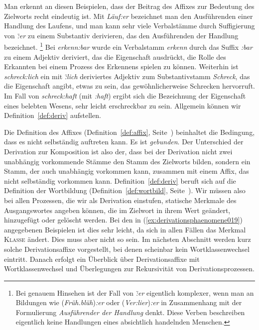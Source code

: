 Man erkennt an diesen Beispielen, dass der Beitrag des Affixes zur Bedeutung des Zielworts recht eindeutig ist.
Mit \textit{Läuf:er} bezeichnet man den Ausführenden einer Handlung des Laufens, und man kann sehr viele Verbalstämme durch Suffigierung von \textit{\~:er} zu einem Substantiv derivieren, das den Ausführenden der Handlung bezeichnet.%
\footnote{Bei genauem Hinsehen ist der Fall von \textit{\~:er} eigentlich komplexer, wenn man an Bildungen wie (\textit{Früh.blüh})\textit{:er} oder (\textit{Ver:lier})\textit{:er} in Zusammenhang mit der Formulierung \textit{Ausführender der Handlung} denkt.
Diese Verben beschreiben eigentlich keine Handlungen eines absichtlich handelnden Menschen.}
Bei \textit{erkenn:bar} wurde ein Verbalstamm \textit{erkenn} durch das Suffix \textit{:bar} zu einem Adjektiv deriviert, das die Eigenschaft ausdrückt, die Rolle des Erkannten bei einem Prozess des Erkennens spielen zu können.
Weiterhin ist \textit{schreck:lich} ein mit \textit{\~:lich} deriviertes Adjektiv zum Substantivstamm \textit{Schreck}, das die Eigenschaft angibt, etwas zu sein, das gewöhnlicherweise Schrecken hervorruft.
Im Fall von \textit{schreck:haft} (mit \textit{:haft}) ergibt sich die Bezeichnung der Eigenschaft eines belebten Wesens, sehr leicht erschreckbar zu sein.
Allgemein können wir Definition~\ref{def:deriv} aufstellen.


Die Definition des Affixes (Definition~\ref{def:affix}, Seite~\pageref{def:affix}) beinhaltet die Bedingung, dass es nicht selbständig auftreten kann.
Es ist \textit{gebunden}.
Der Unterschied der Derivation zur Komposition ist also der, dass bei der Derivation nicht zwei unabhängig vorkommende Stämme den Stamm des Zielworts bilden, sondern ein Stamm, der auch unabhängig vorkommen kann, zusammen mit einem Affix, das nicht selbständig vorkommen kann.
Definition~\ref{def:deriv} beruft sich auf die Definition der Wortbildung (Definition~\ref{def:wortbild}, Seite~\pageref{def:wortbild}).
Wir müssen also bei allen Prozessen, die wir als Derivation einstufen, statische Merkmale des Ausgangswortes angeben können, die im Zielwort in ihrem Wert geändert, hinzugefügt oder gelöscht werden.
Bei den in (\ref{ex:derivationsphaenomene019}) angegebenen Beispielen ist dies sehr leicht, da sich in allen Fällen das Merkmal \textsc{Klasse} ändert.
Dies muss aber nicht so sein.
Im nächsten Abschnitt werden kurz solche Derivationsaffixe vorgestellt, bei denen scheinbar kein Wortklassenwechsel eintritt.
Danach erfolgt ein Überblick über Derivationsaffixe mit Wortklassenwechsel und Überlegungen zur Rekursivität von Derivationsprozessen.

